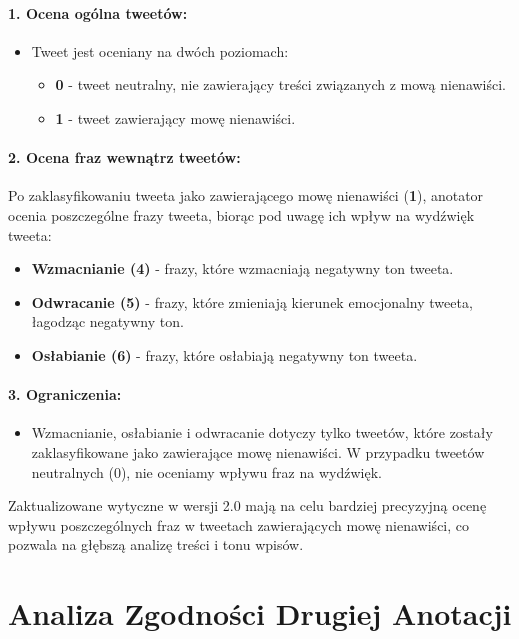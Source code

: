 \documentclass[12pt]{article}
\begin{document}
\paragraph{1. Ocena ogólna tweetów:}
\begin{itemize}
    \item Tweet jest oceniany na dwóch poziomach:
    \begin{itemize}
        \item \textbf{0} - tweet neutralny, nie zawierający treści związanych z mową nienawiści.
        \item \textbf{1} - tweet zawierający mowę nienawiści.
    \end{itemize}
\end{itemize}

\paragraph{2. Ocena fraz wewnątrz tweetów:}
Po zaklasyfikowaniu tweeta jako zawierającego mowę nienawiści (\textbf{1}), anotator ocenia poszczególne frazy tweeta, biorąc pod uwagę ich wpływ na wydźwięk tweeta:
\begin{itemize}
    \item \textbf{Wzmacnianie (4)} - frazy, które wzmacniają negatywny ton tweeta.
    \item \textbf{Odwracanie (5)} - frazy, które zmieniają kierunek emocjonalny tweeta, łagodząc negatywny ton.
    \item \textbf{Osłabianie (6)} - frazy, które osłabiają negatywny ton tweeta.
\end{itemize}

\paragraph{3. Ograniczenia:}
\begin{itemize}
    \item Wzmacnianie, osłabianie i odwracanie dotyczy tylko tweetów, które zostały zaklasyfikowane jako zawierające mowę nienawiści. W przypadku tweetów neutralnych (0), nie oceniamy wpływu fraz na wydźwięk.
\end{itemize}

Zaktualizowane wytyczne w wersji 2.0 mają na celu bardziej precyzyjną ocenę wpływu poszczególnych fraz w tweetach zawierających mowę nienawiści, co pozwala na głębszą analizę treści i tonu wpisów.

\section{Analiza Zgodności Drugiej Anotacji}
\end{document}
